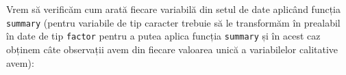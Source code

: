 \documentclass[]{article}
\newenvironment{Shaded}{\begin{snugshade}}{\end{snugshade}}
\newcommand{\KeywordTok}[1]{\textcolor[rgb]{0.13,0.29,0.53}{\textbf{#1}}}
\newcommand{\DecValTok}[1]{\textcolor[rgb]{0.00,0.00,0.81}{#1}}
\newcommand{\StringTok}[1]{\textcolor[rgb]{0.31,0.60,0.02}{#1}}
\newcommand{\CommentTok}[1]{\textcolor[rgb]{0.56,0.35,0.01}{\textit{#1}}}
\newcommand{\OperatorTok}[1]{\textcolor[rgb]{0.81,0.36,0.00}{\textbf{#1}}}
\newcommand{\NormalTok}[1]{#1}
\begin{document}
\begin{Shaded}
\end{Shaded}

Vrem să verificăm cum arată fiecare variabilă din setul de date aplicând
funcția \texttt{summary} (pentru variabile de tip caracter trebuie să le
transformăm în prealabil în date de tip \texttt{factor} pentru a putea
aplica funcția \texttt{summary} și în acest caz obținem câte observații
avem din fiecare valoarea unică a variabilelor calitative avem):
\end{document}
